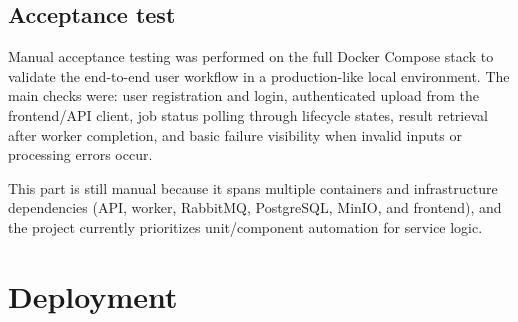 \documentclass{scrartcl}
\begin{document}
\subsection{Acceptance test}\label{acceptance-test}


Manual acceptance testing was performed on the full Docker Compose stack to validate the end-to-end user workflow in a production-like local environment. The main checks were: user registration and login, authenticated upload from the frontend/API client, job status polling through lifecycle states, result retrieval after worker completion, and basic failure visibility when invalid inputs or processing errors occur.

This part is still manual because it spans multiple containers and infrastructure dependencies (API, worker, RabbitMQ, PostgreSQL, MinIO, and frontend), and the project currently prioritizes unit/component automation for service logic.

\section{Deployment}\label{deployment}


  
  
\end{document}
